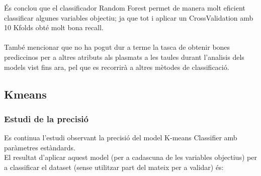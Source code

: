 \documentclass[a4paper, 11pt]{article}
\begin{document}
És conclou que el classificador Random Forest permet de manera molt eficient classificar algunes variables objectiu; ja que tot i aplicar un CrossValidation amb 10 Kfolds obté molt bona recall.\\\\
També mencionar que no ha pogut dur a terme la tasca de obtenir bones prediccinos per a altres atributs als plasmats a les taules durant l'analisis dels models vist fins ara, pel que es recorrirà a altres mètodes de classificació.

\newpage

\subsection{Kmeans}\label{random}
\subsubsection{Estudi de la precisió}
Es continua l'estudi observant la precisió del model K-means Classifier amb paràmetres estàndards.\\
El resultat d'aplicar aquest model (per a cadascuna de les variables objectius) per a classificar el dataset (sense utilitzar part del mateix per a validar) és:
\end{document}
